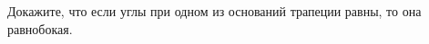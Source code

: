 \begin{ex}
	\begin{condition}
		Докажите, что если углы при одном из оснований трапеции равны, то она равнобокая.
	\end{condition}
\end{ex}